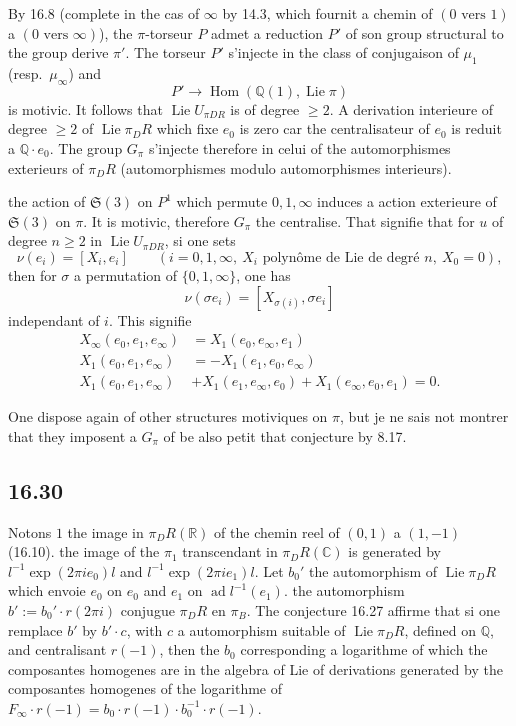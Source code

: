\documentclass[12pt,a4paper]{article}
\theoremstyle{plain}
\theoremstyle{definition}
\theoremstyle{remark}
\DeclareMathOperator{\Lie}{Lie}
\DeclareMathOperator{\ad}{ad}
\DeclareMathOperator{\Hom}{Hom}
\newcommand{\Betti}{B}
\newcommand{\dR}{DR}
\newcommand{\QQ}{\mathbb{Q}}
\newcommand{\CC}{\mathbb{C}}
\newcommand{\RR}{\mathbb{R}}
\begin{document}
By 16.8 (complete in the cas of $\infty$ by 14.3, which fournit a
chemin of $(0 \text{ vers } 1)$ a $(0 \text{ vers } \infty)$), the
$\pi$-torseur $P$ admet a reduction $P'$ of son group structural to the
group derive $\pi'$. The torseur $P'$ s'injecte in the class of
conjugaison of $\mu_1$ (resp.\ $\mu_\infty$) and
\[
P' \to \Hom(\QQ(1), \Lie \pi)
\]
is motivic. It follows that $\Lie U_{\pi\dR}$ is of degree
$\geq 2$. A derivation interieure of degree $\geq 2$ of
$\Lie \pi_\dR$ which fixe $e_0$ is zero car the centralisateur of $e_0$
is reduit a $\QQ \cdot e_0$. The group $G_\pi$ s'injecte therefore in
celui of the automorphismes exterieurs of $\pi_\dR$ (automorphismes modulo
automorphismes interieurs).

the action of $\mathfrak{S}(3)$ on $P^1$ which permute $0,1,\infty$ induces
a action exterieure of $\mathfrak{S}(3)$ on $\pi$. It is
motivic, therefore $G_\pi$ the centralise. That signifie that for $u$ of degree $n \geq 2$ in $\Lie U_{\pi\dR}$, si one sets
\begin{equation}\label{eq:16.29.1}
\nu(e_i) = [X_i, e_i] \qquad (i=0,1,\infty,\ X_i \text{ polyn\^ome de
Lie de degr\'e } n,\ X_0 = 0),
\end{equation}
then for $\sigma$ a permutation of $\{0,1,\infty\}$, one has
\[
\nu(\sigma e_i) = [X_{\sigma(i)}, \sigma e_i]
\]
independant of $i$. This signifie
\begin{align*}
X_\infty(e_0,e_1,e_\infty) &= X_1(e_0,e_\infty,e_1) \\
X_1(e_0,e_1,e_\infty) &= -X_1(e_1,e_0,e_\infty) \\
X_1(e_0,e_1,e_\infty) &+ X_1(e_1,e_\infty,e_0) +
X_1(e_\infty,e_0,e_1) = 0.
\end{align*}

One dispose again of other structures motiviques on $\pi$, but je ne
sais not montrer that they imposent a $G_\pi$ of be also petit that
conjecture by 8.17.

\subsection*{16.30}

Notons $1$ the image in $\pi_\dR(\RR)$ of the chemin reel of $(0,1)$ a
$(1,-1)$ (16.10). the image of the $\pi_1$ transcendant in $\pi_\dR(\CC)$
is generated by $l^{-1}\exp(2\pi i e_0)l$ and
$l^{-1}\exp(2\pi i e_1)l$. Let $b_0'$ the automorphism of $\Lie \pi_\dR$
which envoie $e_0$ on $e_0$ and $e_1$ on $\ad l^{-1}(e_1)$.
the automorphism $b' := b_0' \cdot r(2\pi i)$ conjugue $\pi_\dR$ en
$\pi_\Betti$. The conjecture 16.27 affirme that si one remplace $b'$ by
$b' \cdot c$, with $c$ a automorphism suitable of $\Lie \pi_\dR$,
defined on $\QQ$, and centralisant $r(-1)$, then the $b_0$ corresponding
a logarithme of which the composantes homogenes are in the algebra
of Lie of derivations generated by the composantes homogenes of the
logarithme of $F_\infty \cdot r(-1) = b_0 \cdot r(-1) \cdot b_0^{-1} \cdot
r(-1)$.
\end{document}
